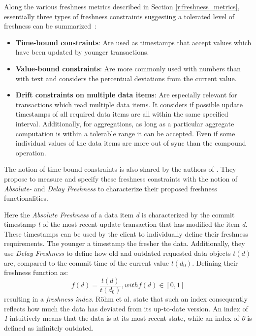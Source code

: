 Along the various freshness metrics described in Section \ref{r:freshness_metrics}, essentially three types of freshness constraints
suggesting a tolerated level of freshness can be summarized~\cite{tamer:2005, hennemann_sw_2021}:
\begin{itemize}
    \item \textbf{Time-bound constraints}: Are used as timestamps that accept values which have been updated by younger transactions. 

    \item \textbf{Value-bound constraints}: Are more commonly used with numbers than with text and considers the percentual deviations from the current value.

    \item \textbf{Drift constraints on multiple data items}: Are especially relevant for transactions which read multiple data items. It considers if possible 
    update timestamps of all required data items are all within the same specified interval. Additionally, for aggregations, as long as a particular aggregate computation 
    is within a tolerable range it can be accepted. Even if some individual values of the data items are more out of sync than the compound operation.
\end{itemize}

The notion of time-bound constraints is also shared by the authors of \cite{voicu:2010}. They propose to measure and specify these freshness constraints 
with the notion of \emph{Absolute-} and \emph{Delay Freshness} to characterize their proposed freshness functionalities.

Here the \textit{Absolute Freshness} of a data item \textit{d} is characterized by the commit timestamp \textit{t} 
of the most recent update transaction that has modified the item \textit{d}.
These timestamps can be used by the client to individually define their freshness requirements. The younger a timestamp the fresher the data.
Additionally, they use \textit{Delay Freshness} to define how old and outdated requested data objects $t(d)$ are, compared to the commit time of the current value $t(d_0)$.
Defining their freshness function as:
\begin{equation}
    f(d) = \frac{t(d)}{t(d_0)},  with f(d) \in [0,1]
\end{equation} 
resulting in a \emph{freshness index}.
Röhm et al. \cite{rohm:2002} state that such an index consequently reflects how much the data has deviated from its up-to-date version.
An index of \emph{1} intuitively means that the data is at its most recent state, while an index of \emph{0} is defined as infinitely outdated.

